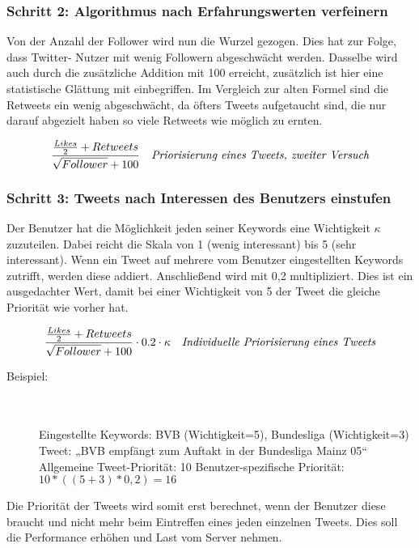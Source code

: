 \subsubsection*{Schritt 2: Algorithmus nach Erfahrungswerten verfeinern}

Von der Anzahl der Follower wird nun die Wurzel gezogen. Dies hat zur Folge, dass Twitter-
Nutzer mit wenig Followern abgeschwächt werden. Dasselbe wird auch durch die zusätzliche 
Addition mit 100 erreicht, zusätzlich ist hier eine statistische Glättung mit 
einbegriffen. Im Vergleich zur alten Formel sind die Retweets ein wenig abgeschwächt, da 
öfters Tweets aufgetaucht sind, die nur darauf abgezielt haben so viele Retweets wie 
möglich zu ernten. 
 
\begin{equation}
\frac{\frac{Likes}{2} + Retweets}{\sqrt{Follower} + 100} 
\quad
\text{\textit{Priorisierung eines Tweets, zweiter Versuch}}
\end{equation}
%
\newpage
%
\subsubsection*{Schritt 3: Tweets nach Interessen des Benutzers einstufen}

Der Benutzer hat die Möglichkeit jeden seiner Keywords eine Wichtigkeit \(\kappa\) zuzuteilen. Dabei reicht 
die Skala von 1 (wenig interessant) bis 5 (sehr interessant).  Wenn ein Tweet auf mehrere vom Benutzer 
eingestellten Keywords zutrifft, werden diese addiert. Anschließend wird mit 0,2 multipliziert. Dies ist ein 
ausgedachter Wert, damit bei einer Wichtigkeit von 5 der Tweet die gleiche Priorität wie vorher hat. 

\begin{equation}
\frac{\frac{Likes}{2} + Retweets}{\sqrt{Follower} + 100} \cdot 0.2 \cdot \kappa 
\quad
\text{\textit{Individuelle Priorisierung eines Tweets}}
\end{equation}
\bigskip 
\begin{description}
	\item [Beispiel:] \hfill \\\\ Eingestellte Keywords: BVB (Wichtigkeit=5), Bundesliga (Wichtigkeit=3) \newline Tweet: „BVB empfängt zum Auftakt in der Bundesliga Mainz 05“ \newline Allgemeine Tweet-Priorität: 10 \newline Benutzer-spezifische Priorität: \(10 * ((5 + 3) * 0,2) = 16 \) 
\end{description}
Die Priorität der Tweets wird somit erst berechnet, wenn der Benutzer diese braucht und nicht mehr beim 
Eintreffen eines jeden einzelnen Tweets. Dies soll die Performance erhöhen und Last vom Server nehmen. 